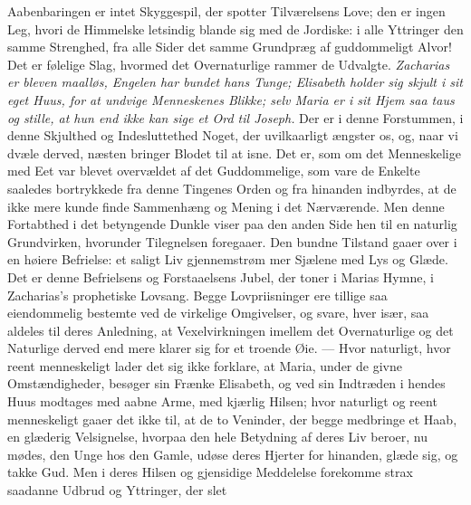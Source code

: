 \documentclass[12pt,a4paper]{book}
\begin{document}
Aabenbaringen er intet Skyggespil, der spotter Tilværelsens Love; den er ingen
Leg, hvori de Himmelske letsindig blande sig med de Jordiske: i alle Yttringer
den samme Strenghed, fra alle Sider det samme Grundpræg af guddommeligt Alvor!
Det er følelige Slag, hvormed det Overnaturlige rammer de Udvalgte.
\emph{Zacharias er bleven maalløs, Engelen har bundet hans Tunge; Elisabeth
holder sig skjult i sit eget Huus, for at undvige Menneskenes Blikke; selv Maria
er i sit Hjem saa taus og stille, at hun end ikke kan sige et Ord til Joseph.}
Der er i denne Forstummen, i denne Skjulthed og Indesluttethed Noget, der
uvilkaarligt ængster os, og, naar vi dvæle derved, næsten bringer Blodet til at
isne. Det er, som om det Menneskelige med Eet var blevet overvældet af det
Guddommelige, som vare de Enkelte saaledes bortrykkede fra denne Tingenes Orden
og fra hinanden indbyrdes, at de ikke mere kunde finde Sammenhæng og Mening i
det Nærværende. Men denne Fortabthed i det betyngende Dunkle viser paa den anden
Side hen til en naturlig Grundvirken, hvorunder Tilegnelsen foregaaer. Den
bundne Tilstand gaaer over i en høiere Befrielse: et saligt Liv
gjennemstrøm\-%
mer Sjælene med Lys og Glæde. Det er denne Befrielsens og Forstaaelsens Jubel,
der toner i Marias Hymne, i Zacharias's prophetiske Lovsang. Begge
Lovpriisninger ere tillige saa eiendommelig bestemte ved de virkelige
Omgivelser, og svare, hver især, saa aldeles til deres Anledning, at
Vexelvirkningen imellem det Overnaturlige og det Naturlige derved end mere
klarer sig for et troende Øie. --- Hvor naturligt, hvor reent menneskeligt lader
det sig ikke forklare, at Maria, under de givne Omstændigheder, besøger sin
Frænke Elisabeth, og ved sin Indtræden i hendes Huus modtages med aabne Arme,
med kjærlig Hilsen; hvor naturligt og reent menneskeligt gaaer det ikke til, at
de to Veninder, der begge medbringe et Haab, en glæderig Velsignelse, hvorpaa
den hele Betydning af deres Liv beroer, nu mødes, den Unge hos den Gamle, udøse
deres Hjerter for hinanden, glæde sig, og takke Gud. Men i deres Hilsen og
gjensidige Meddelelse forekomme strax saadanne Udbrud og Yttringer, der slet
\end{document}
